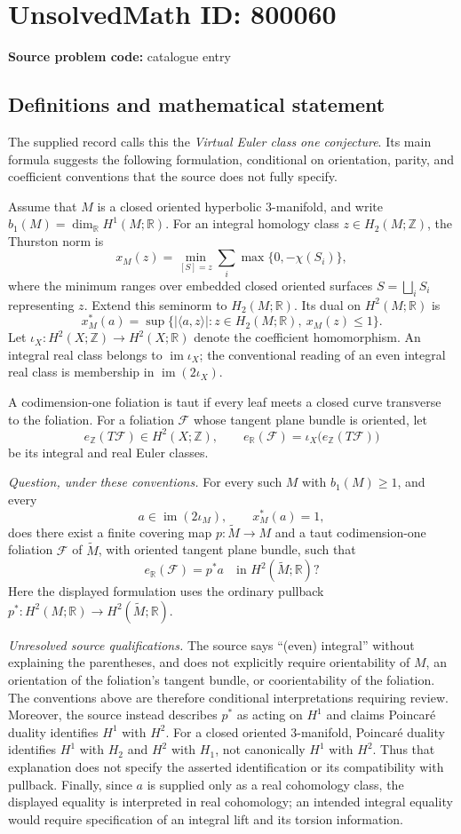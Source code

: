 \documentclass[11pt]{article}
\newcommand{\Z}{\mathbb{Z}}
\newcommand{\R}{\mathbb{R}}
\begin{document}
\section*{UnsolvedMath ID: 800060}
\textbf{Source problem code:} catalogue entry
\subsection{Definitions and mathematical statement}
The supplied record calls this the \emph{Virtual Euler class one conjecture}. Its main formula suggests the following formulation, conditional on orientation, parity, and coefficient conventions that the source does not fully specify.

Assume that \(M\) is a closed oriented hyperbolic \(3\)-manifold, and write \(b_1(M)=\dim_{\R}H^1(M;\R)\). For an integral homology class \(z\in H_2(M;\Z)\), the Thurston norm is
\[
 x_M(z)=\min_{[S]=z}\sum_i\max\{0,-\chi(S_i)\},
\]
where the minimum ranges over embedded closed oriented surfaces \(S=\bigsqcup_i S_i\) representing \(z\). Extend this seminorm to \(H_2(M;\R)\). Its dual on \(H^2(M;\R)\) is
\[
 x_M^*(a)=\sup\bigl\{|\langle a,z\rangle|:z\in H_2(M;\R),\ x_M(z)\leq 1\bigr\}.
\]
Let \(\iota_X:H^2(X;\Z)\to H^2(X;\R)\) denote the coefficient homomorphism. An integral real class belongs to \(\operatorname{im}\iota_X\); the conventional reading of an even integral real class is membership in \(\operatorname{im}(2\iota_X)\).

A codimension-one foliation is taut if every leaf meets a closed curve transverse to the foliation. For a foliation \(\mathcal F\) whose tangent plane bundle is oriented, let
\[
 e_{\Z}(T\mathcal F)\in H^2(X;\Z),\qquad
 e_{\R}(\mathcal F)=\iota_X\bigl(e_{\Z}(T\mathcal F)\bigr)
\]
be its integral and real Euler classes.

\emph{Question, under these conventions.} For every such \(M\) with \(b_1(M)\geq 1\), and every
\[
 a\in\operatorname{im}(2\iota_M),\qquad x_M^*(a)=1,
\]
does there exist a finite covering map \(p:\widetilde M\to M\) and a taut codimension-one foliation \(\mathcal F\) of \(\widetilde M\), with oriented tangent plane bundle, such that
\[
 e_{\R}(\mathcal F)=p^*a
 \quad\text{in }H^2(\widetilde M;\R)?
\]
Here the displayed formulation uses the ordinary pullback \(p^*:H^2(M;\R)\to H^2(\widetilde M;\R)\).

\emph{Unresolved source qualifications.} The source says ``(even) integral'' without explaining the parentheses, and does not explicitly require orientability of \(M\), an orientation of the foliation's tangent bundle, or coorientability of the foliation. The conventions above are therefore conditional interpretations requiring review. Moreover, the source instead describes \(p^*\) as acting on \(H^1\) and claims Poincar\'e duality identifies \(H^1\) with \(H^2\). For a closed oriented \(3\)-manifold, Poincar\'e duality identifies \(H^1\) with \(H_2\) and \(H^2\) with \(H_1\), not canonically \(H^1\) with \(H^2\). Thus that explanation does not specify the asserted identification or its compatibility with pullback. Finally, since \(a\) is supplied only as a real cohomology class, the displayed equality is interpreted in real cohomology; an intended integral equality would require specification of an integral lift and its torsion information.
\end{document}
